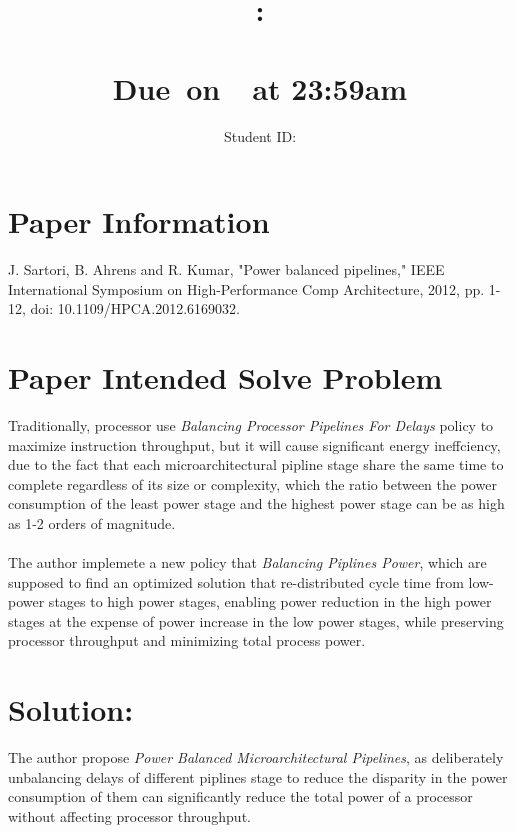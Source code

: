 \documentclass{article}
\title{
    \vspace{2in}
    \textmd{\textbf{\hmwkClass:\\  \hmwkTitle}}\\
    \normalsize\vspace{0.1in}\small{Due\ on\ \hmwkDueDate\ at 23:59am}\\
   \vspace{2in}
}
\author{
	Student ID: \hmwkAuthorID}
\date{}
\begin{document}
\maketitle
\pagebreak
\tableofcontents

\pagebreak



\section{Paper Information}
J. Sartori, B. Ahrens and R. Kumar, "Power balanced pipelines," IEEE International Symposium on High-Performance Comp Architecture, 2012, pp. 1-12, doi: 10.1109/HPCA.2012.6169032.
\section{Paper Intended Solve Problem}
Traditionally, processor use \emph{Balancing Processor Pipelines For Delays} policy to maximize instruction throughput, but it will cause significant energy ineffciency, due to the fact that each microarchitectural pipline stage share the same time to complete regardless of its size or complexity, which the ratio between the power consumption of the least power stage and the highest power stage can be as high as 1-2 orders of magnitude.\\\\
The author implemete a new policy that \emph{Balancing Piplines Power}, which are supposed to find an optimized solution that re-distributed cycle time from low-power stages to high power stages, enabling power reduction in the high power stages at the expense of power increase in the low power stages, while preserving processor throughput and minimizing total process power.
\section{Solution:}
The author propose \emph{Power Balanced Microarchitectural Pipelines}, as deliberately unbalancing delays of different piplines stage to reduce the disparity in the power consumption of them can significantly reduce the total power of a processor without affecting processor throughput.
\end{document}
